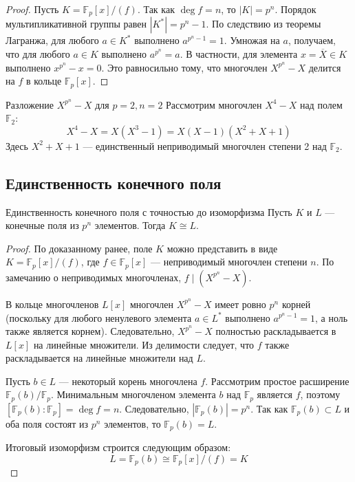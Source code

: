 \begin{proof}
	Пусть $K = \mathbb{F}_p[x]/(f)$. Так как $\deg f = n$, то $|K| = p^n$. 
	Порядок мультипликативной группы равен $|K^*| = p^n - 1$. По следствию из теоремы Лагранжа, для любого $a \in K^*$ выполнено $a^{p^n - 1} = 1$. 
	Умножая на $a$, получаем, что для любого $a \in K$ выполнено $a^{p^n} = a$.
	В частности, для элемента $x = \overline{X} \in K$ выполнено $x^{p^n} - x = 0$. Это равносильно тому, что многочлен $X^{p^n} - X$ делится на $f$ в кольце $\mathbb{F}_p[x]$.
\end{proof}

\begin{Example}{Разложение $X^{p^n} - X$ для $p=2, n=2$}{}
	Рассмотрим многочлен $X^4 - X$ над полем $\mathbb{F}_2$:
	\[ X^4 - X = X(X^3 - 1) = X(X - 1)(X^2 + X + 1) \]
	Здесь $X^2 + X + 1$ --- единственный неприводимый многочлен степени 2 над $\mathbb{F}_2$.
\end{Example}

\subsection{Единственность конечного поля}

\begin{Theorem}{Единственность конечного поля с точностью до изоморфизма}{}
	Пусть $K$ и $L$ --- конечные поля из $p^n$ элементов. Тогда $K \cong L$.
\end{Theorem}

\begin{proof}
	По доказанному ранее, поле $K$ можно представить в виде $K = \mathbb{F}_p[x]/(f)$, где $f \in \mathbb{F}_p[x]$ --- неприводимый многочлен степени $n$. По замечанию о неприводимых многочленах, $f \mid (X^{p^n} - X)$. 
	
	В кольце многочленов $L[x]$ многочлен $X^{p^n} - X$ имеет ровно $p^n$ корней (поскольку для любого ненулевого элемента $a \in L^*$ выполнено $a^{p^n-1} = 1$, а ноль также является корнем). Следовательно, $X^{p^n} - X$ полностью раскладывается в $L[x]$ на линейные множители. Из делимости следует, что $f$ также раскладывается на линейные множители над $L$.
	
	Пусть $b \in L$ --- некоторый корень многочлена $f$. Рассмотрим простое расширение $\mathbb{F}_p(b) / \mathbb{F}_p$. Минимальным многочленом элемента $b$ над $\mathbb{F}_p$ является $f$, поэтому $[\mathbb{F}_p(b) : \mathbb{F}_p] = \deg f = n$. 
	Следовательно, $|\mathbb{F}_p(b)| = p^n$. Так как $\mathbb{F}_p(b) \subset L$ и оба поля состоят из $p^n$ элементов, то $\mathbb{F}_p(b) = L$.
	
	Итоговый изоморфизм строится следующим образом:
	\[ L = \mathbb{F}_p(b) \cong \mathbb{F}_p[x]/(f) = K \]
\end{proof}


